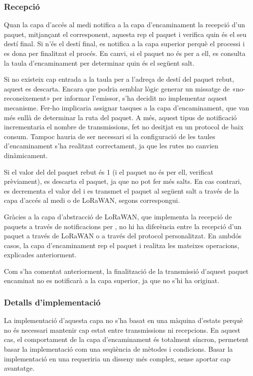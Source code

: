 \documentclass{tfgitic}[2024/07/01]
\begin{document}
{\subsubsection{Recepció}
\label{subsubsec:routing_rx}
Quan la capa d’accés al medi notifica a la capa d’encaminament la recepció d’un paquet, mitjançant el  corresponent, aquesta rep el paquet i verifica quin és el seu destí final. Si n'és el destí final, es notifica a la capa superior perquè el processi i es dona per finalitzat el procés. En canvi, si el paquet no és per a ell, es consulta la taula d’encaminament per determinar quin és el següent salt.

Si no existeix cap entrada a la taula per a l’adreça de destí del paquet rebut, aquest es descarta. Encara que podria semblar lògic generar un missatge de «no-reconeixement» per informar l’emissor, s’ha decidit no implementar aquest mecanisme. Fer-ho implicaria assignar tasques a la capa d’encaminament, que van més enllà de determinar la ruta del paquet. A més, aquest tipus de notificació incrementaria el nombre de transmissions, fet no desitjat en un protocol de baix consum. Tampoc hauria de ser necessari si la configuració de les taules d’encaminament s'ha realitzat correctament, ja que les rutes no canvien dinàmicament.

Si el valor del  del paquet rebut és 1 (i el paquet no és per ell, verificat prèviament), es descarta el paquet, ja que no pot fer més salts. En cas contrari, es decrementa el valor del  i es transmet el paquet al següent salt a través de la capa d'accés al medi o de LoRaWAN, segons correspongui.

Gràcies a la capa d'abstracció de LoRaWAN, que implementa la recepció de paquets a través de notificacions per , no hi ha diferència entre la recepció d'un paquet a través de LoRaWAN o a través del protocol personalitzat. En ambdós casos, la capa d'encaminament rep el paquet i realitza les mateixes operacions, explicades anteriorment.

Com s'ha comentat anteriorment, la finalització de la transmissió d'aquest paquet encaminat no es notificarà a la capa superior, ja que no s'hi ha originat.
\subsubsection{Detalls d'implementació}
La implementació d’aquesta capa no s’ha basat en una màquina d’estats perquè no és necessari mantenir cap estat entre transmissions ni recepcions. En aquest cas, el comportament de la capa d’encaminament és totalment síncron, permetent basar la implementació com una seqüència de mètodes i condicions. Basar la implementació en una  requeriria un disseny més complex, sense aportar cap avantatge. 
 
}
\end{document}
